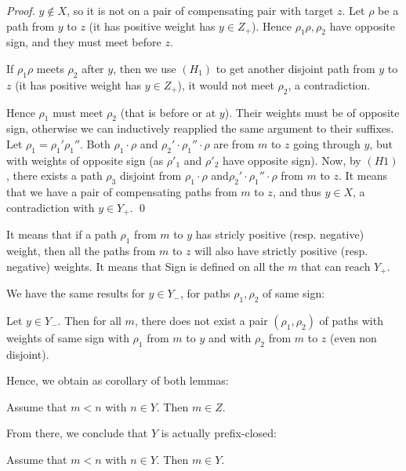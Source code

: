 \begin{proof}
  $y \notin X$, so it is not on a pair of compensating pair with target $z$.
  Let $\rho$ be a path from $y$ to $z$ (it has positive weight has $y \in Z_+$).
  Hence $\rho_1 \rho, \rho_2$ have opposite sign, and they must meet before $z$.

  If $\rho_1 \rho$ meets $\rho_2$ after $y$, then we use $(H_1)$ to get another disjoint path from $y$ to $z$ (it has positive weight has $y \in Z_+$), it would not meet $\rho_2$, a contradiction.

  Hence $\rho_1$ must meet $\rho_2$ (that is before or at $y$).
  Their weights must be of opposite sign, otherwise we can inductively reapplied the same argument to their suffixes.
  Let $\rho_1=\rho_1'\rho_1''$.
  Both $\rho_1 \cdot \rho$ and $\rho_2' \cdot \rho_1'' \cdot \rho$
  are from $m$ to $z$ going through $y$, but with weights of opposite sign (as $\rho'_1$ and $\rho'_2$ have opposite sign).
  Now, by $(H1)$, there exists a path $\rho_3$ disjoint from $\rho_1 \cdot \rho$ and$\rho_2' \cdot \rho_1'' \cdot \rho$ from $m$ to $z$. It means that we have a pair of compensating paths from $m$ to $z$, and thus $y \in X$, a contradiction with $y \in Y_+$. \qed
\end{proof}

It means that if a path $\rho_1$ from $m$ to $y$ has stricly positive (resp. negative) weight, then all the paths from $m$ to $z$ will also have strictly positive (resp. negative) weights. It means that Sign is defined on all the $m$ that can reach $Y_+$.

We have the same results for $y \in Y_-$, for paths $\rho_1, \rho_2$ of same sign:

\begin{lemma}
	\label{lemma11}
	Let $y \in Y_-$. Then for all $m$, there does not exist a pair $(\rho_1,\rho_2)$ 
	of paths with weights of same sign with $\rho_1$ from $m$ to $y$ and 
	with $\rho_2$ from $m$ to $z$ (even non disjoint).
\end{lemma}

Hence, we obtain as corollary of both lemmas:

\begin{corollary}
\label{cor:simple}
Assume that $m < n$ with $n \in Y$.
Then $m \in Z$.
\end{corollary}

From there, we conclude that $Y$ is actually prefix-closed:

\begin{lemma}
	\label{lemma12}
	Assume that $m < n$ with $n \in Y$.
	Then $m \in Y$.
\end{lemma}

